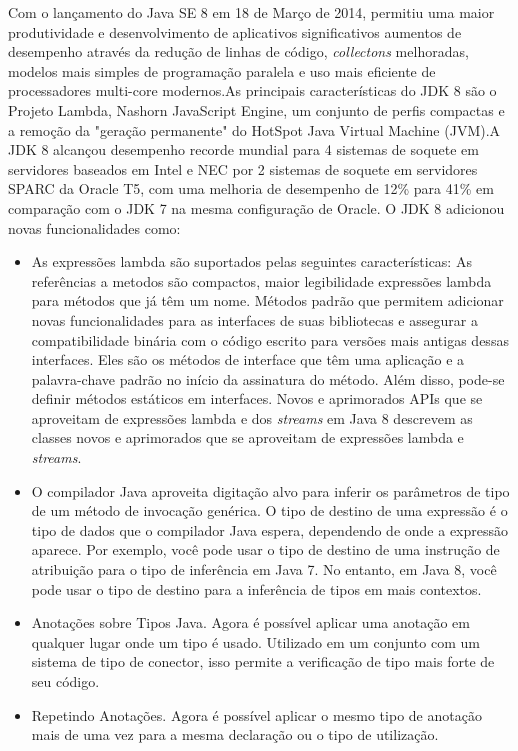 Com o lançamento do Java SE 8 em 18 de Março de 2014, permitiu uma maior produtividade e desenvolvimento de aplicativos significativos aumentos de desempenho através da redução de linhas de código, {\it collectons} melhoradas, modelos mais simples de programação paralela e uso mais eficiente de processadores multi-core modernos.As principais características do JDK 8 são o Projeto Lambda, Nashorn JavaScript Engine, um conjunto de perfis compactas e a remoção da "geração permanente" do HotSpot Java Virtual Machine (JVM).A JDK 8 alcançou desempenho recorde mundial para 4 sistemas de soquete em servidores baseados em Intel e NEC por 2 sistemas de soquete em servidores SPARC da Oracle T5, com uma melhoria de desempenho de 12\% para 41\% em comparação com o JDK 7 na mesma configuração de Oracle.
O JDK 8 adicionou novas funcionalidades como:
  \begin{itemize}
  \item As expressões lambda são suportados pelas seguintes características: As referências a metodos são compactos, maior legibilidade expressões lambda para métodos que já têm um nome. Métodos padrão que permitem adicionar novas funcionalidades para as interfaces de suas bibliotecas e assegurar a compatibilidade binária com o código escrito para versões mais antigas dessas interfaces. Eles são os métodos de interface que têm uma aplicação e a palavra-chave padrão no início da assinatura do método. Além disso, pode-se definir métodos estáticos em interfaces. Novos e aprimorados APIs que se aproveitam de expressões lambda e dos {\it streams} em Java 8 descrevem as classes novos e aprimorados que se aproveitam de expressões lambda e {\it streams}.
  \item O compilador Java aproveita digitação alvo para inferir os parâmetros de tipo de um método de invocação genérica. O tipo de destino de uma expressão é o tipo de dados que o compilador Java espera, dependendo de onde a expressão aparece. Por exemplo, você pode usar o tipo de destino de uma instrução de atribuição para o tipo de inferência em Java 7. No entanto, em Java 8, você pode usar o tipo de destino para a inferência de tipos em mais contextos.
  \item Anotações sobre Tipos Java. Agora é possível aplicar uma anotação em qualquer lugar onde um tipo é usado. Utilizado em um conjunto com um sistema de tipo de conector, isso permite a verificação de tipo mais forte de seu código.
  \item  Repetindo Anotações. Agora é possível aplicar o mesmo tipo de anotação mais de uma vez para a mesma declaração ou o tipo de utilização.
  \end{itemize}\\
